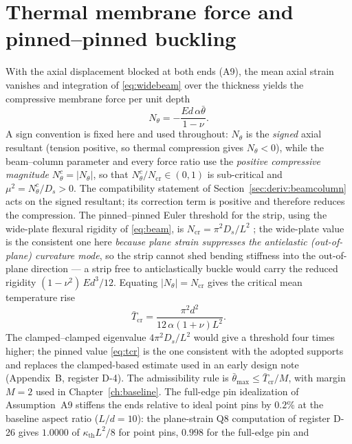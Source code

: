 \section{Thermal membrane force and pinned--pinned buckling}
\label{sec:deriv:buckling}
With the axial displacement blocked at both ends (A9), the mean axial strain vanishes and
integration of \eqref{eq:widebeam} over the thickness yields the compressive membrane force per
unit depth
\begin{equation}
N_\theta=-\frac{Ed\,\alpha\bar\theta}{1-\nu} .
\label{eq:ntheta}
\end{equation}
A sign convention is fixed here and used throughout: $N_\theta$ is the \emph{signed} axial
resultant (tension positive, so thermal compression gives $N_\theta<0$), while the
beam--column parameter and every force ratio use the \emph{positive compressive magnitude}
$N_\theta^c=|N_\theta|$, so that $N_\theta^c/N_{\mathrm{cr}}\in(0,1)$ is sub-critical and
$\mu^2=N_\theta^c/D_s>0$. The compatibility statement of
Section~\ref{sec:deriv:beamcolumn} acts on the signed resultant; its correction term is
positive and therefore reduces the compression.
The pinned--pinned Euler threshold for the strip, using the wide-plate flexural rigidity of
\eqref{eq:beam}, is $N_{\mathrm{cr}}=\pi^2D_s/L^2$ \cite{timoshenko1961stability}; the wide-plate
value is the consistent one here \emph{because plane strain suppresses the antielastic
(out-of-plane) curvature mode}, so the strip cannot shed bending stiffness into the out-of-plane
direction --- a strip free to anticlastically buckle would carry the reduced rigidity
$(1-\nu^2)\,Ed^3/12$. Equating
$|N_\theta|=N_{\mathrm{cr}}$ gives the critical mean temperature rise
\begin{equation}
\bar T_{\mathrm{cr}}=\frac{\pi^2d^2}{12\,\alpha(1+\nu)L^2} .
\label{eq:tcr}
\end{equation}
The clamped--clamped eigenvalue $4\pi^2D_s/L^2$ would give a threshold four times higher; the
pinned value \eqref{eq:tcr} is the one consistent with the adopted supports and replaces the
clamped-based estimate used in an early design note (Appendix~B, register D-4). The admissibility
rule is $\bar\theta_{\max}\le\bar T_{\mathrm{cr}}/M$, with margin $M=2$ used in
Chapter~\ref{ch:baseline}. The full-edge pin idealization of Assumption~A9 stiffens the ends relative to ideal point pins by
$0.2\%$ at the baseline aspect ratio ($L/d=10$): the plane-strain Q8 computation of register D-26
gives $1.0000$ of $\kappa_{\mathrm{th}}L^2/8$ for point pins, $0.998$ for the full-edge pin and
